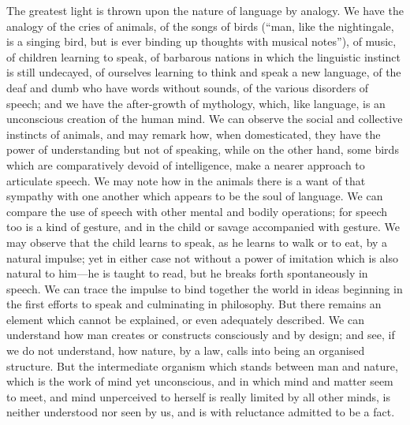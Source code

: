 \documentclass[11pt,letter]{article}
\begin{document}
\par  The greatest light is thrown upon the nature of language by analogy. We have the analogy of the cries of animals, of the songs of birds (“man, like the nightingale, is a singing bird, but is ever binding up thoughts with musical notes”), of music, of children learning to speak, of barbarous nations in which the linguistic instinct is still undecayed, of ourselves learning to think and speak a new language, of the deaf and dumb who have words without sounds, of the various disorders of speech; and we have the after-growth of mythology, which, like language, is an unconscious creation of the human mind. We can observe the social and collective instincts of animals, and may remark how, when domesticated, they have the power of understanding but not of speaking, while on the other hand, some birds which are comparatively devoid of intelligence, make a nearer approach to articulate speech. We may note how in the animals there is a want of that sympathy with one another which appears to be the soul of language. We can compare the use of speech with other mental and bodily operations; for speech too is a kind of gesture, and in the child or savage accompanied with gesture. We may observe that the child learns to speak, as he learns to walk or to eat, by a natural impulse; yet in either case not without a power of imitation which is also natural to him—he is taught to read, but he breaks forth spontaneously in speech. We can trace the impulse to bind together the world in ideas beginning in the first efforts to speak and culminating in philosophy. But there remains an element which cannot be explained, or even adequately described. We can understand how man creates or constructs consciously and by design; and see, if we do not understand, how nature, by a law, calls into being an organised structure. But the intermediate organism which stands between man and nature, which is the work of mind yet unconscious, and in which mind and matter seem to meet, and mind unperceived to herself is really limited by all other minds, is neither understood nor seen by us, and is with reluctance admitted to be a fact.
\end{document}
